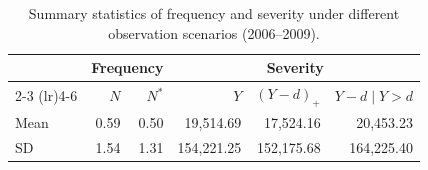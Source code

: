 \begin{table}[h!]
\centering
\begin{tabular}{lrrrrr}
\toprule
 & \multicolumn{2}{c}{Frequency} & \multicolumn{3}{c}{Severity} \\
\cmidrule(lr){2-3}
\cmidrule(lr){4-6}
 & $N$ & $N^*$ & $Y$ & $(Y-d)_+$ & $Y-d\mid Y>d$ \\
\midrule
Mean & 0.59 & 0.50 & 19,514.69 & 17,524.16 & 20,453.23 \\
SD & 1.54 & 1.31 & 154,221.25 & 152,175.68 & 164,225.40 \\
\bottomrule
\end{tabular}
\caption{Summary statistics of frequency and severity under different observation scenarios (2006--2009).}
\label{tab:data summary}
\end{table}
